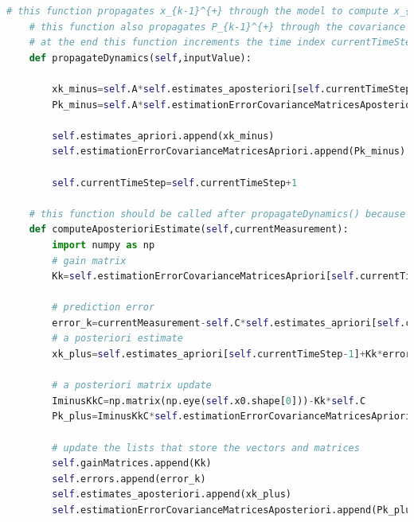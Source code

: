 \begin{lstlisting}[language=Python]
    # this function propagates x_{k-1}^{+} through the model to compute x_{k}^{-}
    # this function also propagates P_{k-1}^{+} through the covariance model to compute P_{k}^{-}
    # at the end this function increments the time index currentTimeStep for +1
    def propagateDynamics(self,inputValue):
        
        xk_minus=self.A*self.estimates_aposteriori[self.currentTimeStep]+self.B*inputValue
        Pk_minus=self.A*self.estimationErrorCovarianceMatricesAposteriori[self.currentTimeStep]*(self.A.T)+self.Q
        
        self.estimates_apriori.append(xk_minus)
        self.estimationErrorCovarianceMatricesApriori.append(Pk_minus)
        
        self.currentTimeStep=self.currentTimeStep+1
    
    # this function should be called after propagateDynamics() because the time step should be increased and states and covariances should be propagated         
    def computeAposterioriEstimate(self,currentMeasurement):
        import numpy as np
        # gain matrix
        Kk=self.estimationErrorCovarianceMatricesApriori[self.currentTimeStep-1]*(self.C.T)*np.linalg.inv(self.R+self.C*self.estimationErrorCovarianceMatricesApriori[self.currentTimeStep-1]*(self.C.T))
        
        # prediction error
        error_k=currentMeasurement-self.C*self.estimates_apriori[self.currentTimeStep-1]
        # a posteriori estimate
        xk_plus=self.estimates_apriori[self.currentTimeStep-1]+Kk*error_k
        
        # a posteriori matrix update 
        IminusKkC=np.matrix(np.eye(self.x0.shape[0]))-Kk*self.C
        Pk_plus=IminusKkC*self.estimationErrorCovarianceMatricesApriori[self.currentTimeStep-1]*(IminusKkC.T)+Kk*(self.R)*(Kk.T)
        
        # update the lists that store the vectors and matrices
        self.gainMatrices.append(Kk)
        self.errors.append(error_k)
        self.estimates_aposteriori.append(xk_plus)
        self.estimationErrorCovarianceMatricesAposteriori.append(Pk_plus)
\end{lstlisting}


